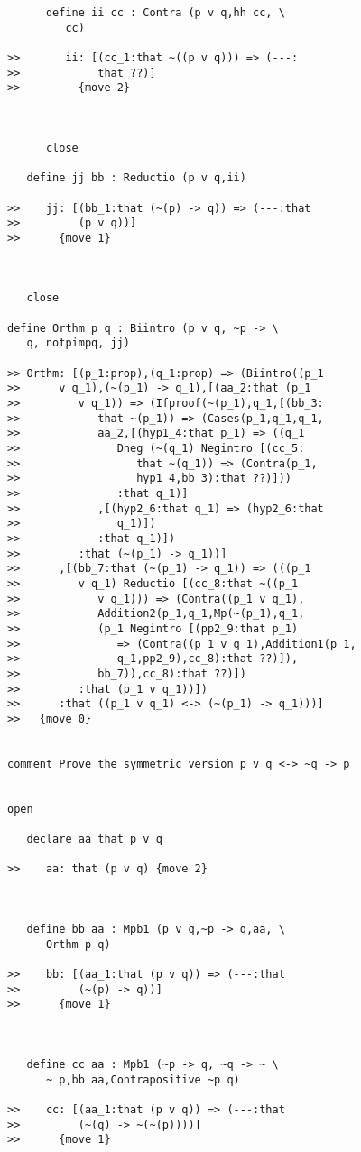 \documentclass[12pt]{article}
\begin{document}
\begin{verbatim}
      define ii cc : Contra (p v q,hh cc, \
         cc)

>>       ii: [(cc_1:that ~((p v q))) => (---:
>>            that ??)]
>>         {move 2}



      close

   define jj bb : Reductio (p v q,ii)

>>    jj: [(bb_1:that (~(p) -> q)) => (---:that
>>         (p v q))]
>>      {move 1}



   close

define Orthm p q : Biintro (p v q, ~p -> \
   q, notpimpq, jj)

>> Orthm: [(p_1:prop),(q_1:prop) => (Biintro((p_1
>>      v q_1),(~(p_1) -> q_1),[(aa_2:that (p_1
>>         v q_1)) => (Ifproof(~(p_1),q_1,[(bb_3:
>>            that ~(p_1)) => (Cases(p_1,q_1,q_1,
>>            aa_2,[(hyp1_4:that p_1) => ((q_1
>>               Dneg (~(q_1) Negintro [(cc_5:
>>                  that ~(q_1)) => (Contra(p_1,
>>                  hyp1_4,bb_3):that ??)]))
>>               :that q_1)]
>>            ,[(hyp2_6:that q_1) => (hyp2_6:that
>>               q_1)])
>>            :that q_1)])
>>         :that (~(p_1) -> q_1))]
>>      ,[(bb_7:that (~(p_1) -> q_1)) => (((p_1
>>         v q_1) Reductio [(cc_8:that ~((p_1
>>            v q_1))) => (Contra((p_1 v q_1),
>>            Addition2(p_1,q_1,Mp(~(p_1),q_1,
>>            (p_1 Negintro [(pp2_9:that p_1)
>>               => (Contra((p_1 v q_1),Addition1(p_1,
>>               q_1,pp2_9),cc_8):that ??)]),
>>            bb_7)),cc_8):that ??)])
>>         :that (p_1 v q_1))])
>>      :that ((p_1 v q_1) <-> (~(p_1) -> q_1)))]
>>   {move 0}


comment Prove the symmetric version p v q <-> ~q -> p


open

   declare aa that p v q

>>    aa: that (p v q) {move 2}



   define bb aa : Mpb1 (p v q,~p -> q,aa, \
      Orthm p q)

>>    bb: [(aa_1:that (p v q)) => (---:that
>>         (~(p) -> q))]
>>      {move 1}



   define cc aa : Mpb1 (~p -> q, ~q -> ~ \
      ~ p,bb aa,Contrapositive ~p q)

>>    cc: [(aa_1:that (p v q)) => (---:that
>>         (~(q) -> ~(~(p))))]
>>      {move 1}




\end{verbatim}
\end{document}
